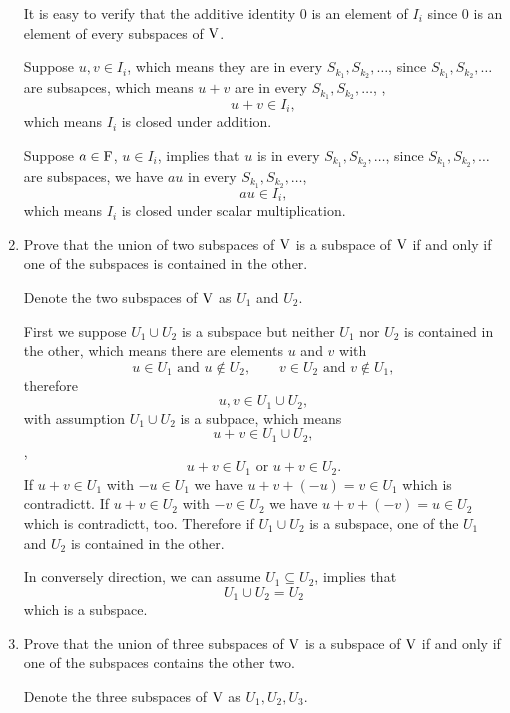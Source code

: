 \begin{enumerate}
\begin{solution}
            It is easy to verify that the additive identity $0$ is an element of $I_i$ since $0$ is an 
            element of every subspaces of $\mathrm{V}$. 

            Suppose $u, v \in I_i$, which means they are in every $S_{k_1}, S_{k_2}, \ldots$, since 
            $S_{k_1}, S_{k_2}, \ldots$ are subsapces, which means $u+v$ are in every  $S_{k_1}, S_{k_2}, \ldots$,
            \ie, 
            \[ u+v \in I_i ,\]
            which means $I_i$ is closed under addition.

            Suppose $a \in \mathrm{F}$, $u \in I_i$, implies that $u$ is in every $S_{k_1}, S_{k_2}, \ldots$, since $S_{k_1}, S_{k_2}, \ldots$
            are subspaces, we have $au$ in every $S_{k_1}, S_{k_2}, \ldots$, \ie 
            \[ au \in I_i ,\]
            which means $I_i$ is closed under scalar multiplication.
        \end{solution}
    \item Prove that the union of two subspaces of $\mathrm{V}$ is a subspace of $\mathrm{V}$ if and only if one of the 
        subspaces is contained in the other.
        \begin{solution}
            Denote the two subspaces of $\mathrm{V}$ as $U_1$ and $U_2$.

            First we suppose $U_1 \cup U_2$ is a subspace but neither $U_1$ nor $U_2$ is contained in the other, 
            which means there are elements $u$ and $v$ with 
            \[ u \in U_1 \text{ and }u \notin U_2,\qquad  v \in U_2 \text{ and } v \notin U_1 ,\]
            therefore 
            \[ u,v \in U_1 \cup U_2 ,\]
            with assumption $U_1 \cup U_2$ is a subpace, which means 
            \[ u+v \in U_1 \cup U_2 ,\]
            \ie, 
            \[ u+v \in U_1 \text{ or } u+v \in U_2.\]
            If $u + v \in U_1$ with $-u \in U_1$ we have $u+v+(-u) = v \in U_1$ which is contradictt.
            If $u + v \in U_2$ with $-v \in U_2$ we have $u+v+(-v) = u \in U_2$ which is contradictt, too.
            Therefore if $U_1 \cup U_2$ is a subspace, one of the $U_1$ and $U_2$ is contained in the other.

            In conversely direction, we can assume $U_1 \subseteq U_2$, implies that 
            \[ U_1 \cup U_2 = U_2 \]
            which is a subspace.
        \end{solution}
    \item Prove that the union of three subspaces of $\mathrm{V}$ is a subspace of $\mathrm{V}$ if and only if one of 
        the subspaces contains the other two.
        \begin{solution}
            Denote the three subspaces of $\mathrm{V}$ as $U_1, U_2, U_3$.



\end{solution}
\end{enumerate}
